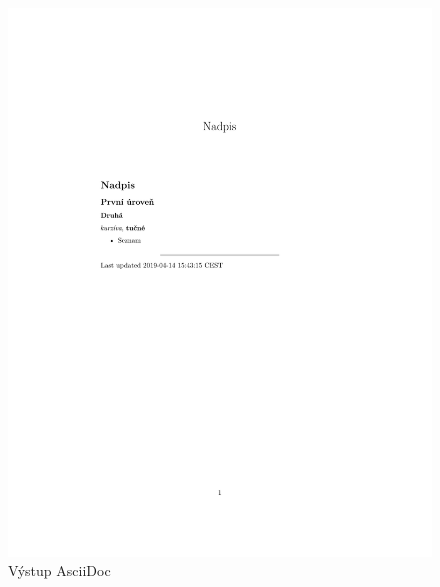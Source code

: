 \begin{figure}[h]
    \centering
    \includegraphics[width=\textwidth]{example-ascii.pdf}
    \caption{Výstup AsciiDoc}
    \label{fig:asciiOutput}
\end{figure}

